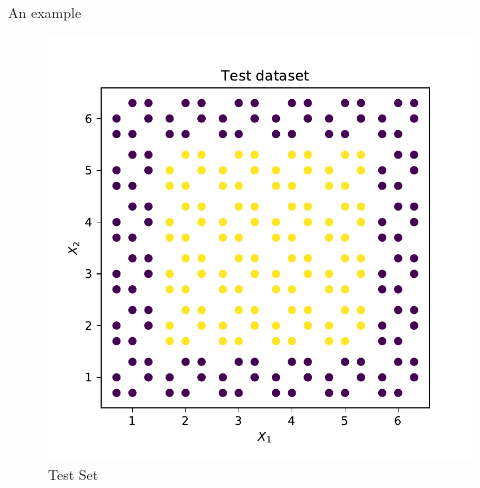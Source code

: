\documentclass{beamer}
\begin{document}
\begin{frame}{An example}
\begin{figure}[h]
\begin{minipage}{0.45\textwidth}
	        \includegraphics[width=\textwidth]{dataset-2-test}
	        \caption{Test Set}
	    \end{minipage}
	\end{figure}
	\end{frame}
\end{document}
